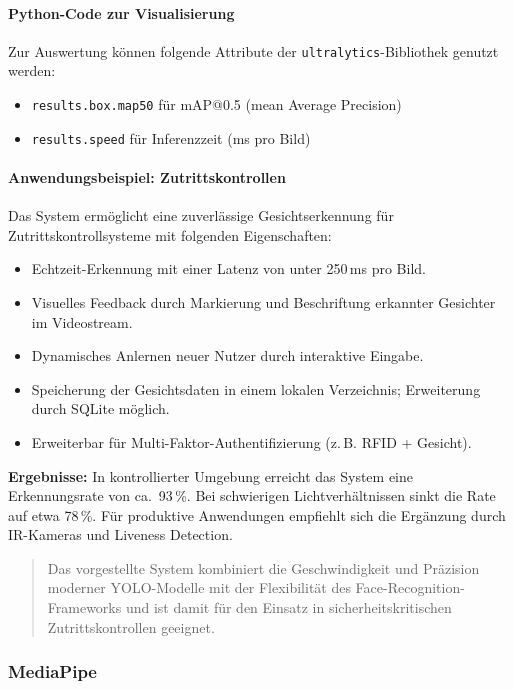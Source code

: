 \paragraph{Python-Code zur Visualisierung}

Zur Auswertung können folgende Attribute der \texttt{ultralytics}-Bibliothek genutzt werden:
\begin{itemize}
    \item \texttt{results.box.map50} für mAP@0.5 (mean Average Precision)
    \item \texttt{results.speed} für Inferenzzeit (ms pro Bild)
\end{itemize}

\paragraph{Anwendungsbeispiel: Zutrittskontrollen}
Das System ermöglicht eine zuverlässige Gesichtserkennung für Zutrittskontrollsysteme mit folgenden Eigenschaften:
\begin{itemize}
    \item Echtzeit-Erkennung mit einer Latenz von unter 250\,ms pro Bild.
    \item Visuelles Feedback durch Markierung und Beschriftung erkannter Gesichter im Videostream.
    \item Dynamisches Anlernen neuer Nutzer durch interaktive Eingabe.
    \item Speicherung der Gesichtsdaten in einem lokalen Verzeichnis; Erweiterung durch SQLite möglich.
    \item Erweiterbar für Multi-Faktor-Authentifizierung (z.\,B. RFID + Gesicht).
\end{itemize}

\textbf{Ergebnisse:} In kontrollierter Umgebung erreicht das System eine Erkennungsrate von ca.~93\,\%. Bei schwierigen Lichtverhältnissen sinkt die Rate auf etwa 78\,\%. Für produktive Anwendungen empfiehlt sich die Ergänzung durch IR-Kameras und Liveness Detection.

\begin{quote}
Das vorgestellte System kombiniert die Geschwindigkeit und Präzision moderner YOLO-Modelle mit der Flexibilität des Face-Recognition-Frameworks und ist damit für den Einsatz in sicherheitskritischen Zutrittskontrollen geeignet.
\end{quote}

\subsubsection{MediaPipe}
